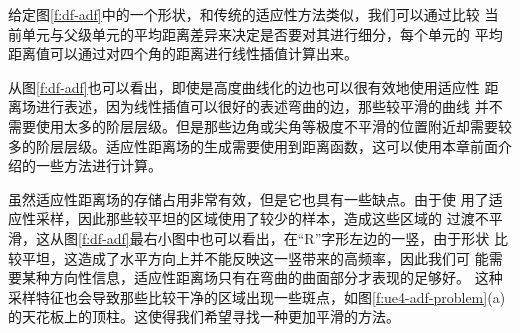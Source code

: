给定图\ref{f:df-adf}中的一个形状，和传统的适应性方法类似，我们可以通过比较 当前单元与父级单元的平均距离差异来决定是否要对其进行细分，每个单元的 平均距离值可以通过对四个角的距离进行线性插值计算出来。

从图\ref{f:df-adf}也可以看出，即使是高度曲线化的边也可以很有效地使用适应性 距离场进行表述，因为线性插值可以很好的表述弯曲的边，那些较平滑的曲线 并不需要使用太多的阶层层级。但是那些边角或尖角等极度不平滑的位置附近却需要较多的阶层层级。适应性距离场的生成需要使用到距离函数，这可以使用本章前面介绍的一些方法进行计算。

虽然适应性距离场的存储占用非常有效，但是它也具有一些缺点。由于使 用了适应性采样，因此那些较平坦的区域使用了较少的样本，造成这些区域的 过渡不平滑，这从图\ref{f:df-adf}最右小图中也可以看出，在“R”字形左边的一竖，由于形状 比较平坦，这造成了水平方向上并不能反映这一竖带来的高频率，因此我们可 能需要某种方向性信息，适应性距离场只有在弯曲的曲面部分才表现的足够好。 这种采样特征也会导致那些比较干净的区域出现一些斑点，如图\ref{f:ue4-adf-problem}(a)的天花板上的顶柱。这使得我们希望寻找一种更加平滑的方法。

